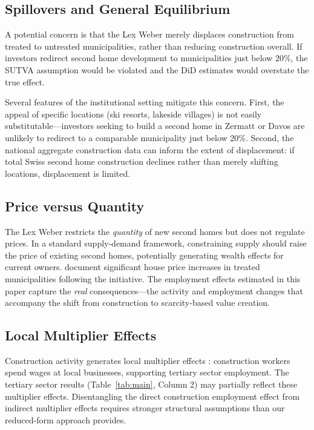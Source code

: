 \documentclass[12pt]{article}
\begin{document}
\subsection{Spillovers and General Equilibrium}

A potential concern is that the Lex Weber merely displaces construction from treated to untreated municipalities, rather than reducing construction overall. If investors redirect second home development to municipalities just below 20\%, the SUTVA assumption would be violated and the DiD estimates would overstate the true effect.

Several features of the institutional setting mitigate this concern. First, the appeal of specific locations (ski resorts, lakeside villages) is not easily substitutable---investors seeking to build a second home in Zermatt or Davos are unlikely to redirect to a comparable municipality just below 20\%. Second, the national aggregate construction data can inform the extent of displacement: if total Swiss second home construction declines rather than merely shifting locations, displacement is limited.

\subsection{Price versus Quantity}

The Lex Weber restricts the \textit{quantity} of new second homes but does not regulate prices. In a standard supply-demand framework, constraining supply should raise the price of existing second homes, potentially generating wealth effects for current owners. \citet{hilberschoni2020} document significant house price increases in treated municipalities following the initiative. The employment effects estimated in this paper capture the \textit{real} consequences---the activity and employment changes that accompany the shift from construction to scarcity-based value creation.

\subsection{Local Multiplier Effects}

Construction activity generates local multiplier effects \citep{moretti2010}: construction workers spend wages at local businesses, supporting tertiary sector employment. The tertiary sector results (Table~\ref{tab:main}, Column 2) may partially reflect these multiplier effects. Disentangling the direct construction employment effect from indirect multiplier effects requires stronger structural assumptions than our reduced-form approach provides.
\end{document}

